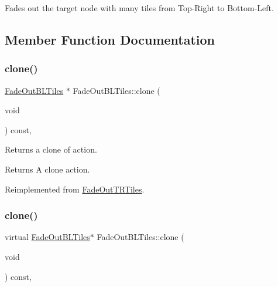 Fades out the target node with many tiles from Top-\/\+Right to Bottom-\/\+Left. 

\subsection{Member Function Documentation}
\mbox{\label{classFadeOutBLTiles_a09ddf5d56bdc979d963430286d50792b}} 
\subsubsection{\texorpdfstring{clone()}{clone()}\hspace{0.1cm}{\footnotesize\ttfamily [1/2]}}
{\footnotesize\ttfamily \hyperlink{classFadeOutBLTiles}{Fade\+Out\+B\+L\+Tiles} $\ast$ Fade\+Out\+B\+L\+Tiles\+::clone (\begin{DoxyParamCaption}\item[{void}]{ }\end{DoxyParamCaption}) const\hspace{0.3cm}{\ttfamily [override]}, {\ttfamily [virtual]}}

Returns a clone of action.

\begin{DoxyReturn}{Returns}
A clone action. 
\end{DoxyReturn}


Reimplemented from \hyperlink{classFadeOutTRTiles_af7a6bf6cfa4ef6cccae911b026e49b48}{Fade\+Out\+T\+R\+Tiles}.

\mbox{\label{classFadeOutBLTiles_ac52607f48d2a78ac604e4064bf72acec}} 
\subsubsection{\texorpdfstring{clone()}{clone()}\hspace{0.1cm}{\footnotesize\ttfamily [2/2]}}
{\footnotesize\ttfamily virtual \hyperlink{classFadeOutBLTiles}{Fade\+Out\+B\+L\+Tiles}$\ast$ Fade\+Out\+B\+L\+Tiles\+::clone (\begin{DoxyParamCaption}\item[{void}]{ }\end{DoxyParamCaption}) const\hspace{0.3cm}{\ttfamily [override]}, {\ttfamily [virtual]}}

